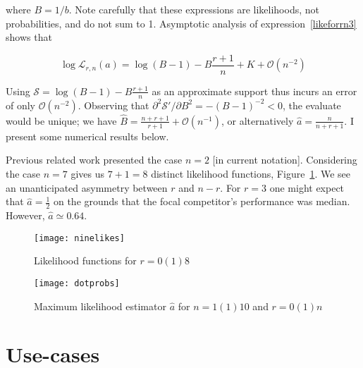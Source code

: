 \documentclass[ejs]{imsart}
\theoremstyle{plain}
\theoremstyle{definition}
\theoremstyle{remark}
\begin{document}
\noindent where $B=1/b$.  Note carefully that these expressions are
likelihoods, not probabilities, and do not sum to 1.  Asymptotic
analysis of expression~\ref{likeforrn3} shows that

\begin{equation}\label{asymptotic}
\log\mathcal{L}_{r,n}(a)=\log(B-1)-B\frac{r+1}{n} 
+ K + \mathcal{O}\left(n^{-2}\right)
\end{equation}

Using $\mathcal{S}=\log(B-1)-B\frac{r+1}{n}$ as an approximate support
thus incurs an error of only $\mathcal{O}(n^{-2})$.  Observing that
$\partial^2\mathcal{S'}/\partial B^2=-(B-1)^{-2}<0$, the evaluate
would be unique; we have
$\hat{B}=\frac{n+r+1}{r+1}+\mathcal{O}\left(n^{-1}\right)$, or
alternatively $\hat{a}=\frac{n}{n+r+1}$.  I present some numerical
results below.

Previous related work presented the case $n=2$ [in current notation].
Considering the case $n=7$ gives us $7+1=8$ distinct likelihood
functions, Figure~\ref{ninelikes}.  We see an unanticipated asymmetry
between $r$ and $n-r$.  For $r=3$ one might expect that
$\hat{a}=\frac{1}{2}$ on the grounds that the focal competitor's
performance was median.  However, $\hat{a}\simeq 0.64$.

\begin{figure}[t]
\texttt{[image: ninelikes]}  %
\caption{Likelihood functions for $r=0(1)8$\label{ninelikes}}
\end{figure}




\begin{figure}[t]
\texttt{[image: dotprobs]}  %
\caption{Maximum likelihood estimator $\hat{a}$ for $n=1(1)10$ and $r=0(1)n$
  \label{dotprobs}}
\end{figure}

\section{Use-cases}
\end{document}
